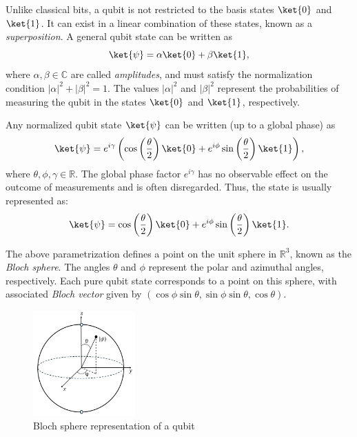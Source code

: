 \begin{definition}
  Unlike classical bits, a qubit is not restricted to the basis states \( \ket{0} \) and \( \ket{1} \). It can exist in a linear combination of these states, known as a \emph{superposition}. A general qubit state can be written as
  \[
  \ket{\psi} = \alpha \ket{0} + \beta \ket{1},
  \]
  where \( \alpha, \beta \in \mathbb{C} \) are called \emph{amplitudes}, and must satisfy the normalization condition \( |\alpha|^2 + |\beta|^2 = 1 \). The values \( |\alpha|^2 \) and \( |\beta|^2 \) represent the probabilities of measuring the qubit in the states \( \ket{0} \) and \( \ket{1} \), respectively.
\end{definition}

\begin{definition}
  Any normalized qubit state \( \ket{\psi} \) can be written (up to a global phase) as
  \[
  \ket{\psi} = e^{i \gamma} \left(\cos\left(\frac{\theta}{2}\right) \ket{0} + e^{i\phi}\sin\left(\frac{\theta}{2}\right)\ket{1}\right),
  \]
  where \( \theta, \phi, \gamma \in \mathbb{R} \). The global phase factor \( e^{i \gamma} \) has no observable effect on the outcome of measurements and is often disregarded. Thus, the state is usually represented as:
  \begin{equation} \label{eq:qubit3}
  \ket{\psi} = \cos\left(\frac{\theta}{2}\right) \ket{0} + e^{i\phi}\sin\left(\frac{\theta}{2}\right)\ket{1}.
  \end{equation}
\end{definition}

\begin{definition} \label{def:boch_sphere_state}
  The above parametrization defines a point on the unit sphere in \( \mathbb{R}^3 \), known as the \emph{Bloch sphere}. The angles \( \theta \) and \( \phi \) represent the polar and azimuthal angles, respectively. Each pure qubit state corresponds to a point on this sphere, with associated \emph{Bloch vector} given by
  $(\cos \phi \sin \theta, \sin \phi \sin \theta, \cos \theta).$
\end{definition}
 
\begin{figure}[H] 
  \centering
  \includegraphics[width=0.35\textwidth]{images/bloch_sphere.jpg}
  \caption{Bloch sphere representation of a qubit}
  \label{fig:bloch_sphere}
\end{figure}

